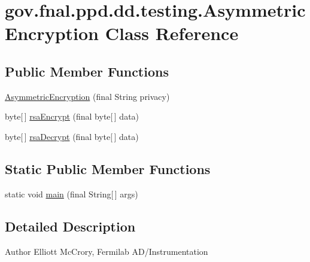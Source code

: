 \hypertarget{classgov_1_1fnal_1_1ppd_1_1dd_1_1testing_1_1AsymmetricEncryption}{\section{gov.\-fnal.\-ppd.\-dd.\-testing.\-Asymmetric\-Encryption Class Reference}
\label{classgov_1_1fnal_1_1ppd_1_1dd_1_1testing_1_1AsymmetricEncryption}
}
\subsection*{Public Member Functions}
\begin{DoxyCompactItemize}
\item 
\hyperlink{classgov_1_1fnal_1_1ppd_1_1dd_1_1testing_1_1AsymmetricEncryption_a5272341af392c74c910ce0874523defe}{Asymmetric\-Encryption} (final String privacy)
\item 
byte\mbox{[}$\,$\mbox{]} \hyperlink{classgov_1_1fnal_1_1ppd_1_1dd_1_1testing_1_1AsymmetricEncryption_a3d19fa6b578aead37afe4328881fe467}{rsa\-Encrypt} (final byte\mbox{[}$\,$\mbox{]} data)
\item 
byte\mbox{[}$\,$\mbox{]} \hyperlink{classgov_1_1fnal_1_1ppd_1_1dd_1_1testing_1_1AsymmetricEncryption_ae076c4919f79815cebae79ca1b62066a}{rsa\-Decrypt} (final byte\mbox{[}$\,$\mbox{]} data)
\end{DoxyCompactItemize}
\subsection*{Static Public Member Functions}
\begin{DoxyCompactItemize}
\item 
static void \hyperlink{classgov_1_1fnal_1_1ppd_1_1dd_1_1testing_1_1AsymmetricEncryption_ae24fff0243749113cb3c1c4c348b8cc3}{main} (final String\mbox{[}$\,$\mbox{]} args)
\end{DoxyCompactItemize}


\subsection{Detailed Description}
\begin{DoxyAuthor}{Author}
Elliott Mc\-Crory, Fermilab A\-D/\-Instrumentation 
\end{DoxyAuthor}


